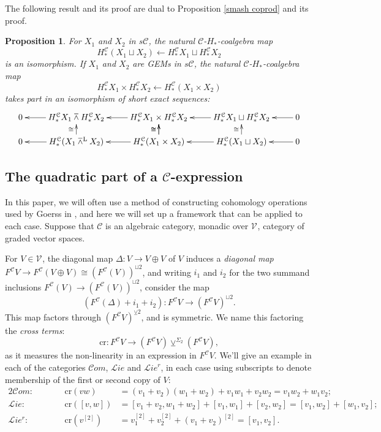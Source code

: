 \documentclass[11pt]{amsart} \renewcommand{\baselinestretch}{1.4}
\theoremstyle{plain}
\newtheorem{prop}[thm]{Proposition}
\theoremstyle{definition}
\renewcommand{\to}{\longrightarrow}
\newcommand{\from}{\longleftarrow}
\newcommand{\scrL}{\mathscr{L}}
\newcommand{\scrC}{\mathscr{C}}
\newcommand{\calV}{\mathcal{V}}
\newcommand{\calc}{\mathcal{C}}
\newcommand{\citeBOX}[2][]{\cite[\mbox{#1}]{#2}}
\newcommand{\restn}[1]{#1^{[2]}}
\newcommand{\vect}[2]{\calV^{#1}_{#2}}
\newcommand{\crossterms}{\mathrm{cr}}
\newcommand{\algs}{{\scrC\!\textit{om}}}
\newcommand{\liealgs}{{\scrL\!\textit{ie}}}
\newcommand{\restliealgs}{{\scrL\!\textit{ie}^\textit{r}}}
\newcommand{\smashprod}{\barwedge}%
\newcommand{\Lsmashprod}{\barwedge^\mathrm{L}}%
\newcommand{\smashcoprod}{\veebar}%
\begin{document}
\begin{Pi-algebras and cohomology algebras}
The following result and its proof are dual to Proposition \ref{smash coprod} and its proof.
\begin{prop}
\label{smash prod}
For $X_1$ and $X_2$ in $s\calc$, the natural $\calc$-$H_*$-coalgebra map
\[H^\calc_*(X_1\sqcup X_2)\from H^\calc_* X_1\sqcup H^\calc_* X_2\]
 is an isomorphism. If $X_1$ and $X_2$ are GEMs in $s\calc$, the natural $\calc$-$H_*$-coalgebra map 
\[H^\calc_* X_1\times H^\calc_* X_2\from H^\calc_*(X_1\times X_2)\]
takes part in an isomorphism of short exact sequences:
\[\xymatrix@R=4mm{
0\ar[r];[]&%
H^\calc_* X_1\smashprod H^\calc_* X_2
\ar[r];[]\ar[d];[]^-{\cong}
&%
H^\calc_* X_1\times H^\calc_* X_2
\ar[r];[]
\ar[d];[]^-{\cong}\ar[d];[]^-{\cong}
&%
H^\calc_* X_1\sqcup H^\calc_* X_2
\ar[r];[]
\ar[d];[]^-{\cong}
&%
0\\%
0\ar[r];[]&%
H^\calc_* (X_1\Lsmashprod X_2)
\ar[r];[]
&%
H^\calc_* (X_1\times X_2)
\ar[r];[]
&%
H^\calc_* (X_1\sqcup X_2)
\ar[r];[]&0
}\]
\end{prop}





\subsection{The quadratic part of a $\calc$-expression}\label{quadratic part section}
In this paper, we will often use a method of constructing cohomology operations used by Goerss in \citeBOX[\S5]{MR1089001}, and here we will set up a framework that can be applied to each case. Suppose that $\calc$ is an algebraic category, monadic over $\vect{}{}$, category of graded vector spaces. 



For $V\in\vect{}{}$, the diagonal map $\Delta:V\to V\oplus V$ of $V$ induces a \emph{diagonal map} $F^\calc V\to F^\calc (V\oplus V)\cong (F^\calc (V))^{\sqcup 2}$, and writing $i_1$ and $i_2$ for the two summand inclusions $F^\calc (V)\to (F^\calc (V))^{\sqcup 2}$, consider the map
\[(F^\calc(\Delta)+i_1+i_2):F^\calc V\to (F^\calc V)^{\sqcup2}.\]
This map  factors through $(F^\calc V)^{\smashcoprod 2}$, and is symmetric. We name this factoring the \emph{cross terms}:
\[\crossterms:F^\calc V\to (F^\calc V)\smashcoprod^{\Sigma_2} (F^\calc V),\]
as it measures the non-linearity in an expression in $F^\calc V$.  We'll give an example in each of the categories $\algs$, $\liealgs$ and $\restliealgs$, in each case using subscripts to denote membership of the first or second copy of $V$:
\begin{alignat*}{2}
\algs:&\qquad&\crossterms(vw)&=(v_1+v_2)(w_1+w_2)+v_1w_1+v_2w_2=v_1w_2+w_1v_2;\\
\liealgs:&\qquad&\crossterms([v,w])&= [v_1+v_2,w_1+w_2]+[v_1,w_1]+[v_2,w_2]=[v_1,w_2]+[w_1,v_2];\\
\restliealgs:&\qquad&\crossterms(\restn{v})&= \restn{v_1}+\restn{v_2}+\restn{(v_1+v_2)}=[v_1,v_2].
\end{alignat*}



\end{Pi-algebras and cohomology algebras}
\end{document}
